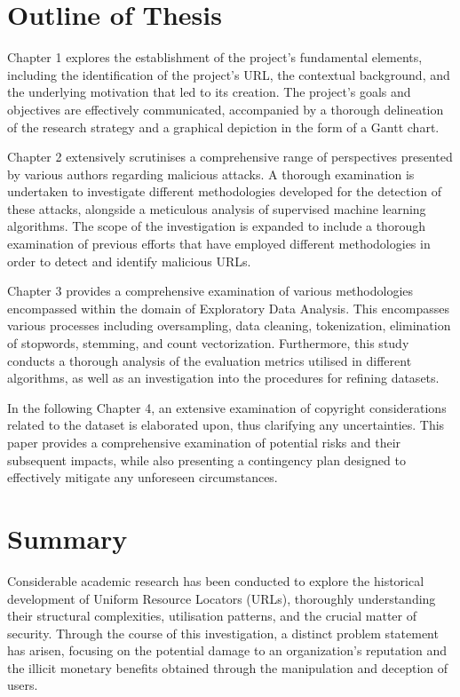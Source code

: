 \section{Outline of Thesis}




Chapter 1 explores the establishment of the project's fundamental elements, including the identification of the project's URL, the contextual background, and the underlying motivation that led to its creation. The project's goals and objectives are effectively communicated, accompanied by a thorough delineation of the research strategy and a graphical depiction in the form of a Gantt chart.

Chapter 2 extensively scrutinises a comprehensive range of perspectives presented by various authors regarding malicious attacks. A thorough examination is undertaken to investigate different methodologies developed for the detection of these attacks, alongside a meticulous analysis of supervised machine learning algorithms. The scope of the investigation is expanded to include a thorough examination of previous efforts that have employed different methodologies in order to detect and identify malicious URLs.

Chapter 3 provides a comprehensive examination of various methodologies encompassed within the domain of Exploratory Data Analysis. This encompasses various processes including oversampling, data cleaning, tokenization, elimination of stopwords, stemming, and count vectorization. Furthermore, this study conducts a thorough analysis of the evaluation metrics utilised in different algorithms, as well as an investigation into the procedures for refining datasets.

In the following Chapter 4, an extensive examination of copyright considerations related to the dataset is elaborated upon, thus clarifying any uncertainties. This paper provides a comprehensive examination of potential risks and their subsequent impacts, while also presenting a contingency plan designed to effectively mitigate any unforeseen circumstances.

\section{Summary}


Considerable academic research has been conducted to explore the historical development of Uniform Resource Locators (URLs), thoroughly understanding their structural complexities, utilisation patterns, and the crucial matter of security. Through the course of this investigation, a distinct problem statement has arisen, focusing on the potential damage to an organization's reputation and the illicit monetary benefits obtained through the manipulation and deception of users.